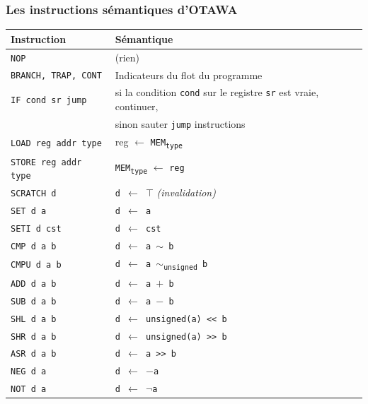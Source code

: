 \documentclass[table]{beamer}
\begin{document}
\renewcommand\arraystretch{0.8} \setlength\minrowclearance{0.8pt}

\begin{frame}[fragile]
    \frametitle{Les instructions sémantiques d'OTAWA}
    \begin{table} \tiny
	\begin{tabular}{|l|l|} \hline
	\textbf{Instruction} & \textbf{Sémantique}\\ \hline \hline
	\texttt{NOP} & (rien)\\ \hline
	\texttt{BRANCH, TRAP, CONT} & Indicateurs du flot du programme\\ \hline
	\texttt{IF cond sr jump} & si la condition \texttt{cond} sur le registre \texttt{sr} est vraie, continuer,\\
	& sinon sauter \texttt{jump} instructions\\ \hline
	\texttt{LOAD reg addr type} & reg $\leftarrow$ \texttt{MEM\textsubscript{type}} \\ \hline
	\texttt{STORE reg addr type} & \texttt{MEM\textsubscript{type}} $\leftarrow$ \texttt{reg}\\ \hline
	\texttt{SCRATCH d} & \texttt{d $\leftarrow$ $\top$} \textit{(invalidation)}\\ \hline
	\texttt{SET d a} & \texttt{d $\leftarrow$ a}\\ \hline
	\texttt{SETI d cst} & \texttt{d $\leftarrow$ cst}\\ \hline
	\texttt{CMP d a b} & \texttt{d $\leftarrow$ a $\sim$ b}\\ \hline
	\rowcolor{Gray} \texttt{CMPU d a b} & \texttt{d $\leftarrow$ a $\sim$\textsubscript{unsigned} b}\\ \hline
	\texttt{ADD d a b} & \texttt{d $\leftarrow$ a $+$ b}\\ \hline
	\texttt{SUB d a b} & \texttt{d $\leftarrow$ a $-$ b}\\ \hline
	\rowcolor{Gray} \texttt{SHL d a b} & \texttt{d $\leftarrow$ unsigned(a) <{<} b}\\ \hline
	\rowcolor{Gray} \texttt{SHR d a b} & \texttt{d $\leftarrow$ unsigned(a) >{>} b}\\ \hline
	\texttt{ASR d a b} & \texttt{d $\leftarrow$ a >{>} b}\\ \hline
	\texttt{NEG d a} & \texttt{d $\leftarrow$ $-$a}\\ \hline
	\rowcolor{Gray} \texttt{NOT d a} & \texttt{d $\leftarrow$ $\neg$a}\\ \hline

\end{tabular}
\end{table}
\end{frame}
\end{document}
